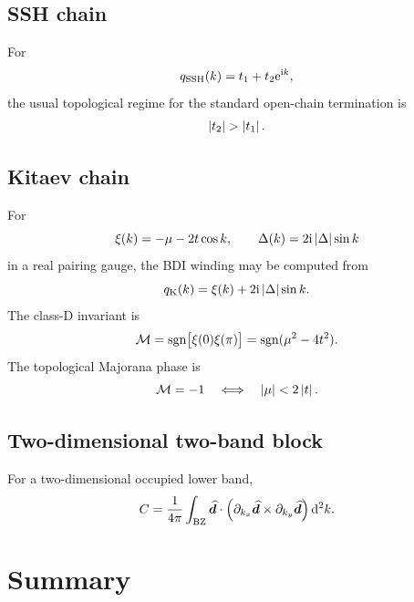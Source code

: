 \subsection*{SSH chain}
For
\begin{equation}
    q_{\rm SSH}(k)=t_1+t_2\mathrm{e}^{\mathrm{i} k},
\end{equation}
the usual topological regime for the standard open-chain termination is
\begin{equation}
\label{eq:topo-summary-ssh}
    \abs{t_2}>\abs{t_1}.
\end{equation}

\subsection*{Kitaev chain}
For
\begin{equation}
    \xi(k)=-\mu-2t\cos k,
    \qquad
    \Delta(k)=2\mathrm{i}\left|\Delta\right|\sin k
\end{equation}
in a real pairing gauge, the BDI winding may be computed from
\begin{equation}
\label{eq:topo-summary-kitaev-winding}
    q_{\rm K}(k)=\xi(k)+2\mathrm{i}\left|\Delta\right|\sin k.
\end{equation}
The class-D invariant is
\begin{equation}
\label{eq:topo-summary-kitaev-z2}
    \mathcal{M}=\operatorname{sgn}\bigl[\xi(0)\xi(\pi)\bigr]
    =\operatorname{sgn}(\mu^2-4t^2).
\end{equation}
The topological Majorana phase is
\begin{equation}
\label{eq:topo-summary-kitaev-topological-phase}
    \mathcal{M}=-1
    \quad\Longleftrightarrow\quad
    \left|\mu\right|<2\left|t\right|.
\end{equation}

\subsection*{Two-dimensional two-band block}
For a two-dimensional occupied lower band,
\begin{equation}
\label{eq:topo-summary-chern}
    C
    =
    \frac{1}{4\pi}\int_{\rm BZ}
    \widehat{\bm d}\cdot
    \left(
        \partial_{k_x}\widehat{\bm d}
        \times
        \partial_{k_y}\widehat{\bm d}
    \right)\mathrm{d}^2k.
\end{equation}

\section{Summary}
\label{sec:topo-summary}

